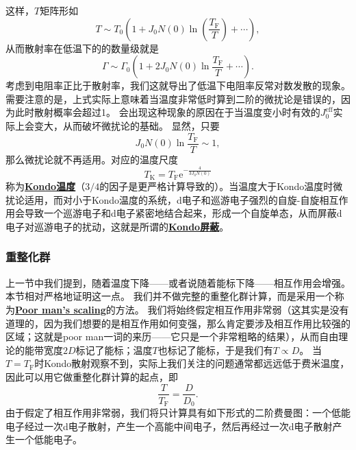 \documentclass[hyperref, UTF8, a4paper]{ctexart}
\newcommand*{\ee}{\mathrm{e}}
\newcommand*{\concept}[1]{\underline{\textbf{#1}}}
\begin{document}
这样，$T$矩阵形如
\[
    T \sim T_0 \left( 1 + J_0 N(0) \ln(\frac{T_\text{F}}{T}) + \cdots \right),
\]
从而散射率在低温下的的数量级就是
\begin{equation}
    \Gamma \sim \Gamma_0 \left(1 + 2 J_0 N(0) \ln \frac{T_\text{F}}{T} + \cdots \right).
\end{equation}
考虑到电阻率正比于散射率，我们这就导出了低温下电阻率反常对数发散的现象。
需要注意的是，上式实际上意味着当温度非常低时算到二阶的微扰论是错误的，因为此时散射概率会超过1。
会出现这种现象的原因在于当温度变小时有效的$J_{0}^\text{eff}$实际上会变大，从而破坏微扰论的基础。
显然，只要
\begin{equation}
    J_0 N(0) \ln \frac{T_\text{F}}{T} \sim 1,
\end{equation}
那么微扰论就不再适用。对应的温度尺度
\begin{equation}
    T_\text{K} = T_\text{F} \ee^{- \frac{4}{3J_0 N(0)}}
\end{equation}
称为\concept{Kondo温度}（$3/4$的因子是更严格计算导致的）。当温度大于Kondo温度时微扰论适用，而对小于Kondo温度的系统，d电子和巡游电子强烈的自旋-自旋相互作用会导致一个巡游电子和d电子紧密地结合起来，形成一个自旋单态，从而屏蔽d电子对巡游电子的扰动，这就是所谓的\concept{Kondo屏蔽}。

\subsubsection{重整化群}

上一节中我们提到，随着温度下降——或者说随着能标下降——相互作用会增强。本节相对严格地证明这一点。
我们并不做完整的重整化群计算，而是采用一个称为\concept{Poor man's scaling}的方法。
我们将始终假定相互作用非常弱（这其实是没有道理的，因为我们想要的是相互作用如何变强，那么肯定要涉及相互作用比较强的区域；这就是poor man一词的来历——它只是一个非常粗略的结果），从而自由理论的能带宽度$2 D$标记了能标；温度$T$也标记了能标，于是我们有$T \propto D$。
当$T=T_\text{F}$时Kondo散射观察不到，实际上我们关注的问题通常都远远低于费米温度，因此可以用它做重整化群计算的起点，即
\begin{equation}
    \frac{T}{T_\text{F}} = \frac{D}{D_0}.
\end{equation}
由于假定了相互作用非常弱，我们将只计算具有如下形式的二阶费曼图：一个低能电子经过一次d电子散射，产生一个高能中间电子，然后再经过一次d电子散射产生一个低能电子。
\end{document}
